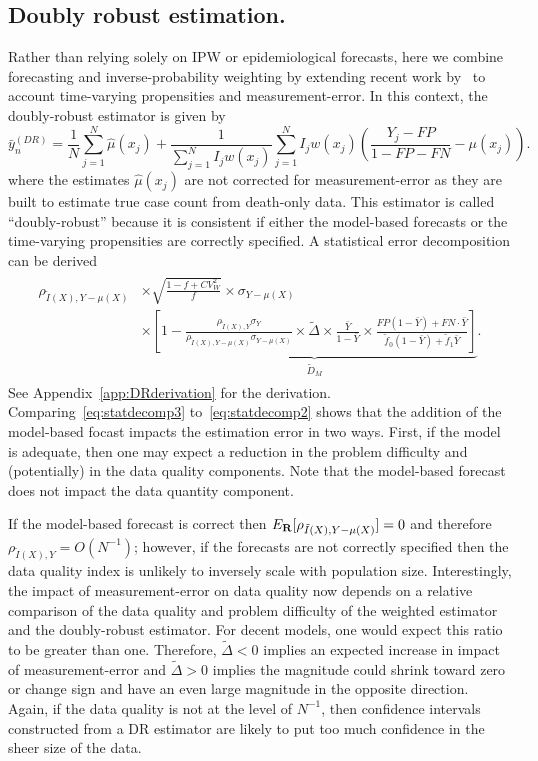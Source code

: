 \documentclass[12pt]{amsart}
\numberwithin{equation}{section}
\theoremstyle{plain}
\begin{document}
\subsection{Doubly robust estimation.}
Rather than relying solely on IPW or epidemiological forecasts, here we combine forecasting and inverse-probability weighting by extending recent work by~\cite{Chen2019} to account time-varying propensities and measurement-error. In this context, the doubly-robust estimator is given by
$$
\bar y_{n}^{(DR)} = \frac{1}{N} \sum_{j=1}^N \hat \mu (x_j) + \frac{1}{\sum_{j=1}^N I_j w (x_j)} \sum_{j=1}^N I_j w(x_j) \left( \frac{Y_j - FP}{1 - FP - FN} - \mu(x_j) \right).
$$
where the estimates $\hat \mu(x_j)$ are not corrected for measurement-error as they are built to estimate true case count from death-only data. This estimator is called ``doubly-robust'' because it is consistent if either the model-based forecasts or the time-varying propensities are correctly specified. A statistical error decomposition can be derived
\begin{align}
\label{eq:statdecomp3}
\begin{split}
\rho_{\tilde I (X), Y-\mu(X)} &\times \sqrt{\frac{1-f+ CV^2_W}{f}} \times \sigma_{Y-\mu(X)}  \\
&\times \underbrace{\left[ 1 - \frac{\rho_{\tilde I(X),Y} \sigma_{Y}}{\rho_{\tilde I(X),Y-\mu(X)} \sigma_{Y-\mu(X)}} \times \tilde \Delta \times \frac{\bar Y}{1-\bar Y} \times \frac{FP(1-\bar Y) + FN \cdot \bar Y}{\tilde f_0 (1-\bar Y) + \tilde f_1 \bar Y} \right]}_{\tilde D_M}.
\end{split}
\end{align}
See Appendix~\ref{app:DRderivation} for the derivation. Comparing~\eqref{eq:statdecomp3} to~\eqref{eq:statdecomp2} shows that the addition of the model-based focast impacts the estimation error in two ways.  First, if the model is adequate, then one may expect a reduction in the problem difficulty and (potentially) in the data quality components. Note that the model-based forecast does not impact the data quantity component.

If the model-based forecast is correct then $E_{\bf R} [ \rho_{\tilde I (X), Y-\mu(X)} ] = 0$  and therefore $\rho_{\tilde I(X), Y} = O(N^{-1})$; however, if the forecasts are not correctly specified then the data quality index is unlikely to inversely scale with population size. Interestingly, the impact of measurement-error on data quality now depends on a relative comparison of the data quality and problem difficulty of the weighted estimator and the doubly-robust estimator.  For decent models, one would expect this ratio to be greater than one.  Therefore, $\tilde \Delta < 0$ implies an expected increase in impact of measurement-error and $\tilde \Delta > 0$ implies the magnitude could shrink toward zero or change sign and have an even large magnitude in the opposite direction.  Again, if the data quality is not at the level of $N^{-1}$, then confidence intervals constructed from a DR estimator are likely to put too much confidence in the sheer size of the data.
\end{document}
